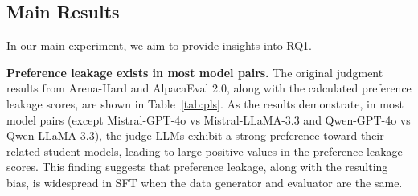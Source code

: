 \documentclass{article} %
\begin{document}
\subsection{Main Results}
\label{Result Analysis}

In our main experiment, we aim to provide insights into RQ1.

\textbf{Preference leakage exists in most model pairs.} The original judgment results from Arena-Hard and AlpacaEval 2.0, along with the calculated preference leakage scores, are shown in Table~\ref{tab:pls}. As the results demonstrate, in most model pairs (except Mistral-GPT-4o vs Mistral-LLaMA-3.3 and Qwen-GPT-4o vs Qwen-LLaMA-3.3), the judge LLMs exhibit a strong preference toward their related student models, leading to large positive values in the preference leakage scores. This finding suggests that preference leakage, along with the resulting bias, is widespread in SFT when the data generator and evaluator are the same.



\end{document}
